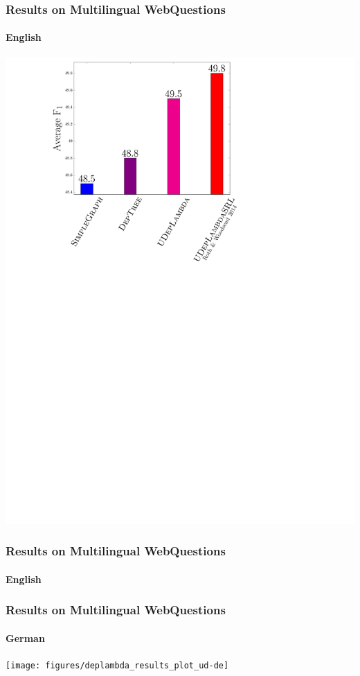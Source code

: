 \documentclass[mathserif,12pt]{beamer}
\begin{document}
\begin{frame}
\frametitle{Results on Multilingual WebQuestions}
\framesubtitle{English}
\centering
\large
\vspace{0.4em}
\includegraphics[trim=9em 0em 29em 1em,clip=true,scale=0.5]{figures/deplambda_results_plot_ud}
\end{frame}

\begin{frame}
\frametitle{Results on Multilingual WebQuestions}
\framesubtitle{English}
\vspace{0.6em}
\end{frame}

\begin{frame}
\frametitle{Results on Multilingual WebQuestions}
\framesubtitle{German}
\centering
\large
\vspace{0.4em}
\texttt{[image: figures/deplambda\_results\_plot\_ud-de]}
\end{frame}
\end{document}
